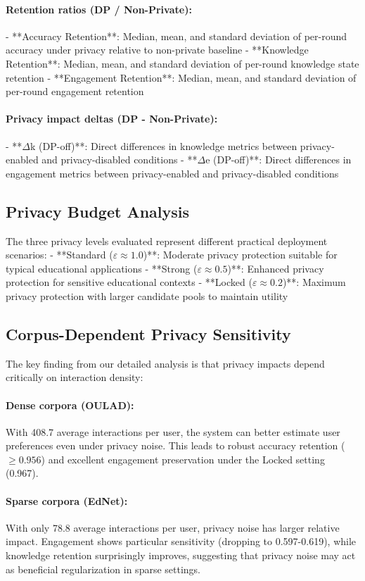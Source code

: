 \paragraph{Retention ratios (DP / Non-Private):} 
- **Accuracy Retention**: Median, mean, and standard deviation of per-round accuracy under privacy relative to non-private baseline
- **Knowledge Retention**: Median, mean, and standard deviation of per-round knowledge state retention  
- **Engagement Retention**: Median, mean, and standard deviation of per-round engagement retention

\paragraph{Privacy impact deltas (DP - Non-Private):}
- **$\Delta$k (DP-off)**: Direct differences in knowledge metrics between privacy-enabled and privacy-disabled conditions
- **$\Delta$e (DP-off)**: Direct differences in engagement metrics between privacy-enabled and privacy-disabled conditions

\subsection{Privacy Budget Analysis}
The three privacy levels evaluated represent different practical deployment scenarios:
- **Standard ($\varepsilon \approx 1.0$)**: Moderate privacy protection suitable for typical educational applications
- **Strong ($\varepsilon \approx 0.5$)**: Enhanced privacy protection for sensitive educational contexts  
- **Locked ($\varepsilon \approx 0.2$)**: Maximum privacy protection with larger candidate pools to maintain utility

\subsection{Corpus-Dependent Privacy Sensitivity}
The key finding from our detailed analysis is that privacy impacts depend critically on interaction density:

\paragraph{Dense corpora (OULAD):} With 408.7 average interactions per user, the system can better estimate user preferences even under privacy noise. This leads to robust accuracy retention ($\geq 0.956$) and excellent engagement preservation under the Locked setting (0.967).

\paragraph{Sparse corpora (EdNet):} With only 78.8 average interactions per user, privacy noise has larger relative impact. Engagement shows particular sensitivity (dropping to 0.597-0.619), while knowledge retention surprisingly improves, suggesting that privacy noise may act as beneficial regularization in sparse settings.

